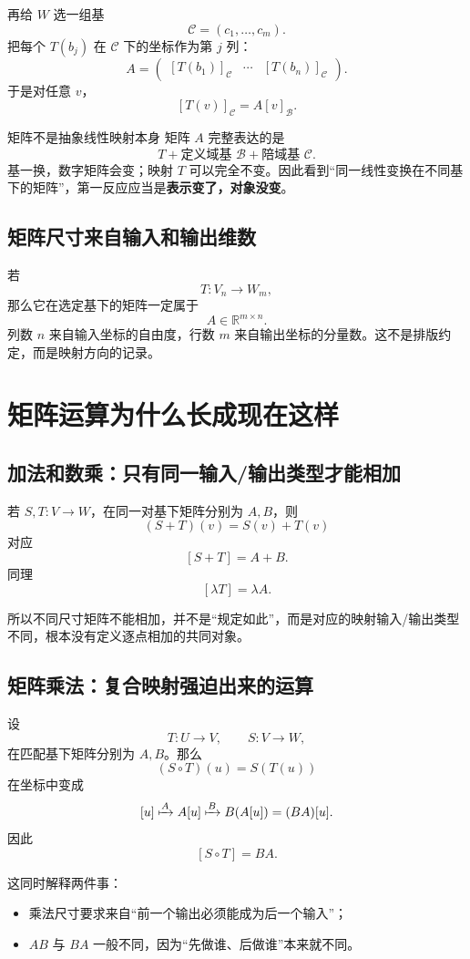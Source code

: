 \documentclass[11pt,a4paper]{ctexart}
\newcommand{\kw}[1]{\textbf{\color{deep}#1}}
\begin{document}
再给 $W$ 选一组基
\[
\mathcal C=(c_1,\dots,c_m).
\]
把每个 $T(b_j)$ 在 $\mathcal C$ 下的坐标作为第 $j$ 列：
\[
A=
\begin{pmatrix}
[T(b_1)]_{\mathcal C}&\cdots&[T(b_n)]_{\mathcal C}
\end{pmatrix}.
\]
于是对任意 $v$，
\[
\boxed{[T(v)]_{\mathcal C}=A[v]_{\mathcal B}.}
\]

\begin{corebox}{矩阵不是抽象线性映射本身}
矩阵 $A$ 完整表达的是
\[
\boxed{T+\text{定义域基 }\mathcal B+\text{陪域基 }\mathcal C.}
\]
基一换，数字矩阵会变；映射 $T$ 可以完全不变。因此看到“同一线性变换在不同基下的矩阵”，第一反应应当是\kw{表示变了，对象没变}。
\end{corebox}

\subsection{矩阵尺寸来自输入和输出维数}

若
\[
T:V_n\to W_m,
\]
那么它在选定基下的矩阵一定属于
\[
A\in\mathbb R^{m\times n}.
\]
列数 $n$ 来自输入坐标的自由度，行数 $m$ 来自输出坐标的分量数。这不是排版约定，而是映射方向的记录。

\section{矩阵运算为什么长成现在这样}

\subsection{加法和数乘：只有同一输入/输出类型才能相加}

若 $S,T:V\to W$，在同一对基下矩阵分别为 $A,B$，则
\[
(S+T)(v)=S(v)+T(v)
\]
对应
\[
[S+T]=A+B.
\]
同理
\[
[\lambda T]=\lambda A.
\]

所以不同尺寸矩阵不能相加，并不是“规定如此”，而是对应的映射输入/输出类型不同，根本没有定义逐点相加的共同对象。

\subsection{矩阵乘法：复合映射强迫出来的运算}

设
\[
T:U\to V,\qquad S:V\to W,
\]
在匹配基下矩阵分别为 $A,B$。那么
\[
(S\circ T)(u)=S(T(u))
\]
在坐标中变成
\[
[u]\xmapsto{A}A[u]\xmapsto{B}B(A[u])=(BA)[u].
\]
因此
\[
\boxed{[S\circ T]=BA.}
\]

这同时解释两件事：
\begin{itemize}
  \item 乘法尺寸要求来自“前一个输出必须能成为后一个输入”；
  \item $AB$ 与 $BA$ 一般不同，因为“先做谁、后做谁”本来就不同。
\end{itemize}
\end{document}
